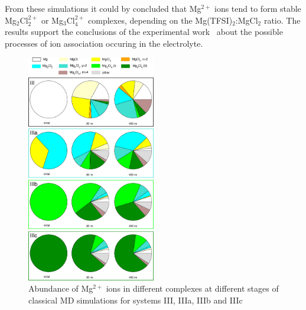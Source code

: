 From these simulations it could by concluded that Mg$^{2+}$ ions tend to form stable Mg$_2$Cl$_2^{2+}$ or Mg$_3$Cl$_4^{2+}$ complexes, depending on the Mg(TFSI)$_2$:MgCl$_2$ ratio. The results support the conclusions of the experimental work~\cite{mg-dme-structures} about the possible processes of ion association occuring in the electrolyte.

\begin{figure}[ht]
    \centering
    \includegraphics[width=0.5\textwidth]{img/3-structural-data-from-md-simulations/3-mg-cl-dme/speciation-2.png}
    \caption{Abundance of Mg$^{2+}$ ions in different complexes at different stages of classical MD simulations for systems III, IIIa, IIIb and IIIc}
    \label{fig:mg-cl-dme-speciation-2}
\end{figure}

\cleardoublepage